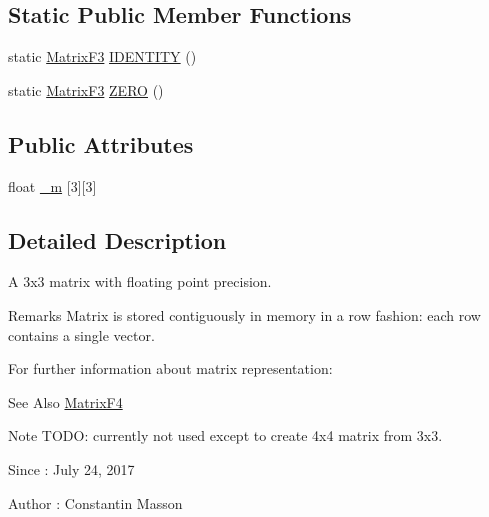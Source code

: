 \subsection*{Static Public Member Functions}
\begin{DoxyCompactItemize}
\item 
static \hyperlink{classMatrixF3}{Matrix\-F3} \hyperlink{classMatrixF3_aad53de325db6f4b2a9b4d0170edde7c5}{I\-D\-E\-N\-T\-I\-T\-Y} ()
\item 
static \hyperlink{classMatrixF3}{Matrix\-F3} \hyperlink{classMatrixF3_a489e82306b03ff5d69929b5f358ccdb4}{Z\-E\-R\-O} ()
\end{DoxyCompactItemize}
\subsection*{Public Attributes}
\begin{DoxyCompactItemize}
\item 
float \hyperlink{classMatrixF3_abdc6de748007031ab31d86cc54ada59f}{\-\_\-m} \mbox{[}3\mbox{]}\mbox{[}3\mbox{]}
\end{DoxyCompactItemize}


\subsection{Detailed Description}
A 3x3 matrix with floating point precision.

\begin{DoxyRemark}{Remarks}
Matrix is stored contiguously in memory in a row fashion\-: each row contains a single vector.

For further information about matrix representation\-: 
\end{DoxyRemark}
\begin{DoxySeeAlso}{See Also}
\hyperlink{classMatrixF4}{Matrix\-F4}
\end{DoxySeeAlso}
\begin{DoxyNote}{Note}
T\-O\-D\-O\-: currently not used except to create 4x4 matrix from 3x3.
\end{DoxyNote}
\begin{DoxySince}{Since}
\-: July 24, 2017 
\end{DoxySince}
\begin{DoxyAuthor}{Author}
\-: Constantin Masson 
\end{DoxyAuthor}


